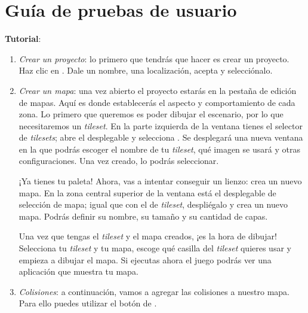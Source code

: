 \chapter{Guía de pruebas de usuario}
\label{Appendix:Key1}

\textbf{Tutorial}:

\begin{enumerate}
	\item \textit{Crear un proyecto}: lo primero que tendrás que hacer es crear un proyecto. Haz clic en . Dale un nombre, una localización, acepta y selecciónalo.

	
	\item \textit{Crear un mapa}: una vez abierto el proyecto estarás en la pestaña de edición de mapas. Aquí es donde establecerás el aspecto y comportamiento de cada zona. Lo primero que queremos es poder dibujar el escenario, por lo que necesitaremos un \textit{tileset}. En la parte izquierda de la ventana tienes el selector de \textit{tilesets}; abre el desplegable y selecciona . Se desplegará una nueva ventana en la que podrás escoger el nombre de tu \textit{tileset}, qué imagen se usará y otras configuraciones. Una vez creado, lo podrás seleccionar.
	
	
	¡Ya tienes tu paleta! Ahora, vas a intentar conseguir un lienzo: crea un nuevo mapa. En la zona central superior de la ventana está el desplegable de selección de mapa; igual que con el de \textit{tileset}, despliégalo y crea un nuevo mapa. Podrás definir su nombre, su tamaño y su cantidad de capas.
	
	
	Una vez que tengas el \textit{tileset} y el mapa creados, ¡es la hora de dibujar! Selecciona tu \textit{tileset} y tu mapa, escoge qué casilla del \textit{tileset} quieres usar y empieza a dibujar el mapa. Si ejecutas ahora el juego podrás ver una aplicación que muestra tu mapa.
	
	
	\item \textit{Colisiones}: a continuación, vamos a agregar las colisiones a nuestro mapa. Para ello puedes utilizar el botón de .
	

\end{enumerate}
